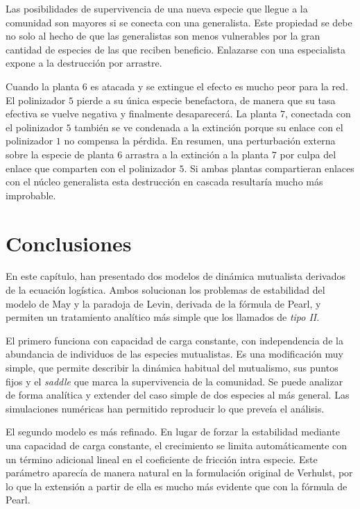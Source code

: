 Las posibilidades de supervivencia de una nueva especie que llegue a la comunidad son mayores si se conecta con una generalista. Este propiedad se debe no solo al hecho de que las generalistas son menos vulnerables por la gran cantidad de especies de las que reciben beneficio. Enlazarse con una especialista expone a la destrucción por arrastre.

Cuando la planta $6$ es atacada y se extingue el efecto es mucho peor para la red. El polinizador $5$ pierde a su única especie benefactora, de manera que su tasa efectiva se vuelve negativa y finalmente desaparecerá. La planta $7$, conectada con el polinizador $5$ también se ve condenada a la extinción porque su enlace con el polinizador $1$ no compensa la pérdida. En resumen, una perturbación externa sobre la especie de planta $6$ arrastra a la extinción a la planta $7$ por culpa del enlace que comparten con el polinizador $5$. Si ambas plantas compartieran enlaces con el núcleo generalista esta destrucción en cascada resultaría mucho más improbable.

\section{Conclusiones}

En este capítulo, han presentado dos modelos de dinámica mutualista derivados de la ecuación logística. Ambos solucionan los problemas de estabilidad del modelo de May y la paradoja de Levin, derivada de la fórmula de Pearl, y permiten un tratamiento analítico más simple que los llamados de \textit{tipo II}.

El primero funciona con capacidad de carga constante, con independencia de la abundancia de individuos de las especies mutualistas. Es una modificación muy simple, que permite describir la dinámica habitual del mutualismo, sus puntos fijos y el \textit{saddle} que marca la supervivencia de la comunidad. Se puede analizar de forma analítica y extender del caso simple de dos especies al más general. Las simulaciones numéricas han permitido reproducir lo que preveía el análisis.

El segundo modelo es más refinado. En lugar de forzar la estabilidad mediante una capacidad de carga constante, el crecimiento se limita automáticamente con un término adicional lineal en el coeficiente de fricción intra especie. Este parámetro aparecía de manera natural en la formulación original de Verhulst, por lo que la extensión a partir de ella es mucho más evidente que con la fórmula de Pearl.

